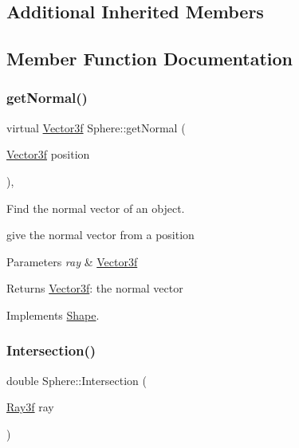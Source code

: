\subsection*{Additional Inherited Members}


\subsection{Member Function Documentation}
\mbox{\label{class_sphere_a46b57f659960b0862efcb6a7be9f1846}} 
\subsubsection{\texorpdfstring{get\+Normal()}{getNormal()}}
{\footnotesize\ttfamily virtual \mbox{\hyperlink{class_vector3f}{Vector3f}} Sphere\+::get\+Normal (\begin{DoxyParamCaption}\item[{\mbox{\hyperlink{class_vector3f}{Vector3f}}}]{position }\end{DoxyParamCaption})\hspace{0.3cm}{\ttfamily [inline]}, {\ttfamily [virtual]}}



Find the normal vector of an object. 

give the normal vector from a position 
\begin{DoxyParams}{Parameters}
{\em ray} & \mbox{\hyperlink{class_vector3f}{Vector3f}} \\
\hline
\end{DoxyParams}
\begin{DoxyReturn}{Returns}
\mbox{\hyperlink{class_vector3f}{Vector3f}}\+: the normal vector 
\end{DoxyReturn}


Implements \mbox{\hyperlink{class_shape_afba80076ff9eb95f7e7c4144e323590f}{Shape}}.

\mbox{\label{class_sphere_af9c784cb35851974251e1585e3717dd9}} 
\subsubsection{\texorpdfstring{Intersection()}{Intersection()}}
{\footnotesize\ttfamily double Sphere\+::\+Intersection (\begin{DoxyParamCaption}\item[{\mbox{\hyperlink{class_ray3f}{Ray3f}}}]{ray }\end{DoxyParamCaption})\hspace{0.3cm}{\ttfamily [virtual]}}



